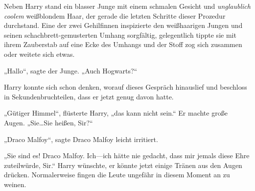 Neben Harry stand ein blasser Junge mit einem schmalen Gesicht und \emph{unglaublich coolem} weißblondem Haar, der gerade die letzten Schritte dieser Prozedur durchstand. Eine der zwei Gehilfinnen inspizierte den weißhaarigen Jungen und seinen schachbrett-gemusterten Umhang sorgfältig, gelegentlich tippte sie mit ihrem Zauberstab auf eine Ecke des Umhangs und der Stoff zog sich zusammen oder weitete sich etwas.

„Hallo“, sagte der Junge. „Auch Hogwarts?“

Harry konnte sich schon denken, worauf dieses Gespräch hinauslief und beschloss in Sekundenbruchteilen, dass er jetzt genug davon hatte.

„Gütiger Himmel“, flüsterte Harry, „das kann nicht sein.“ Er machte große Augen. „Sie…Sie heißen, Sir?“

„Draco Malfoy“, sagte Draco Malfoy leicht irritiert.

„Sie sind es! Draco Malfoy. Ich—ich hätte nie gedacht, dass mir jemals diese Ehre zuteilwürde, Sir.“ Harry wünschte, er könnte jetzt einige Tränen aus den Augen drücken. Normalerweise fingen die Leute ungefähr in diesem Moment an zu weinen.


